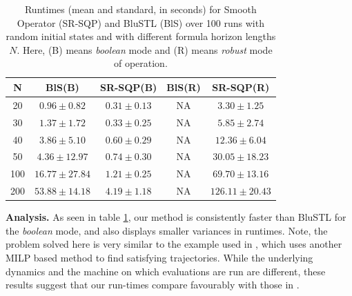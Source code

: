 \begin{table}[tb]
\small
\begin{center}
\caption{{\small Runtimes (mean and standard, in seconds) for Smooth Operator (SR-SQP) and BluSTL (BlS) over 100 runs with random initial states and with different formula horizon lengths $N$. Here, (B) means \textit{boolean} mode and (R) means \textit{robust} mode of operation.}}
\vspace{-5pt}
\label{tbl:time_performance_toy}
\begin{tabular} {|c|c|c|c|c|}
	\hline
	N & BlS(B) & SR-SQP(B) & BlS(R) & SR-SQP(R) \\ \hline
	20 & $0.96 \pm 0.82$ &  $\mathbf{0.31 \pm 0.13}$  & NA & $3.30 \pm 1.25$ \\ \hline
	30 & $1.37 \pm 1.72$ &  $\mathbf{0.33 \pm 0.25}$  & NA & $5.85 \pm 2.74$\\ \hline
	40 & $3.86 \pm 5.10$ &  $\mathbf{0.60 \pm 0.29}$  & NA & $12.36 \pm 6.04$\\ \hline
	50 & $4.36 \pm 12.97$&  $\mathbf{0.74 \pm 0.30}$ & NA & $30.05 \pm 18.23$\\ \hline
	100& $16.77 \pm 27.84$ & $\mathbf{1.21 \pm 0.25}$ & NA & $69.70 \pm 13.16$ \\ \hline
	200& $53.88 \pm 14.18$& $\mathbf{4.19 \pm 1.18}$ & NA & $126.11 \pm 20.43$ \\ \hline
\end{tabular}	
\end{center}
\end{table}

\textbf{Analysis.}
As seen in table \ref{tbl:time_performance_toy}, our method is consistently faster than BluSTL for the \textit{boolean} mode, and also displays smaller variances in runtimes. Note, the problem solved here is very similar to the example used in \cite{Saha_acc16}, which uses another MILP based method to find satisfying trajectories. While the underlying dynamics and the machine on which evaluations are run are different, these results suggest that our run-times compare favourably with those in \cite{Saha_acc16}.

